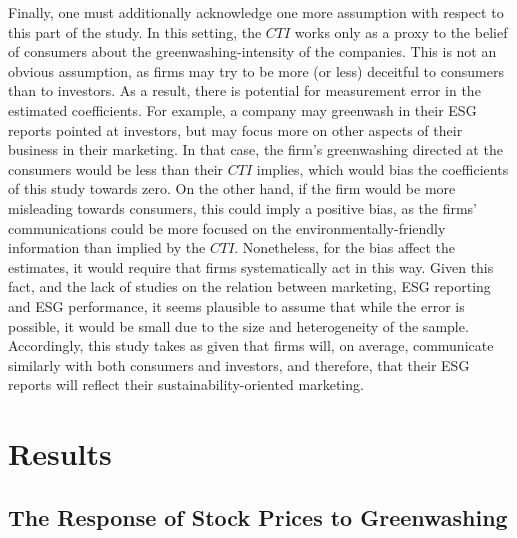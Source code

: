 \documentclass[12pt]{article}
\begin{document}
Finally, one must additionally acknowledge one more assumption with respect to this part of the study. In this setting, the $CTI$ works only as a proxy to the belief of consumers about the greenwashing-intensity of the companies. This is not an obvious assumption, as firms may try to be more (or less) deceitful to consumers than to investors. As a result, there is potential for  measurement error in the estimated coefficients. For example, a company may greenwash in their ESG reports pointed at investors, but may focus more on other aspects of their business in their marketing. In that case, the firm's greenwashing directed at the consumers would be less than their $CTI$ implies, which would bias the coefficients of this study towards zero. On the other hand, if the firm would be more misleading towards consumers, this could imply a positive bias, as the firms' communications could be more focused on the environmentally-friendly information than implied by the $CTI$. Nonetheless, for the bias affect the estimates, it would require that firms systematically act in this way. Given this fact, and the lack of studies on the relation between marketing, ESG reporting and ESG performance, it seems plausible to assume that while the error is possible, it would be small due to the size and heterogeneity of the sample. Accordingly, this study takes as given that firms will, on average, communicate similarly with both consumers and investors, and therefore, that their ESG reports will reflect their sustainability-oriented marketing. 


\section{Results}\label{sect:results}


\subsection{The Response of Stock Prices to Greenwashing}\label{subsect:stocks}
\end{document}

